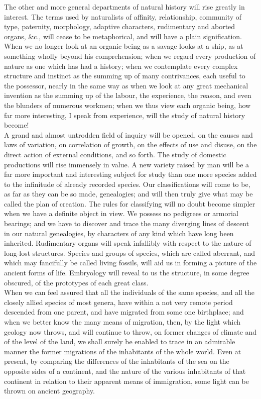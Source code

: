 \indent The other and more general departments of natural history will rise greatly in interest. The terms used by naturalists of affinity, relationship, community of type, paternity, morphology, adaptive characters, rudimentary and aborted organs, \&c., will cease to be metaphorical, and will have a plain signification. When we no longer look at an organic being as a savage looks at a ship, as at something wholly beyond his comprehension; when we regard every production of nature as one which has had a history; when we contemplate every complex structure and instinct as the summing up of many contrivances, each useful to the possessor, nearly in the same way as when we look at any great mechanical invention as the summing up of the labour, the experience, the reason, and even the blunders of numerous workmen; when we thus view each organic being, how far more interesting, I speak from experience, will the study of natural history become!~\\
\indent A grand and almost untrodden field of inquiry will be opened, on the causes and laws of variation, on correlation of growth, on the effects of use and disuse, on the direct action of external conditions, and so forth. The study of domestic productions will rise immensely in value. A new variety raised by man will be a far more important and interesting subject for study than one more species added to the infinitude of already recorded species. Our classifications will come to be, as far as they can be so made, genealogies; and will then truly give what may be called the plan of creation. The rules for classifying will no doubt become simpler when we have a definite object in view. We possess no pedigrees or armorial bearings; and we have to discover and trace the many diverging lines of descent in our natural genealogies, by characters of any kind which have long been inherited. Rudimentary organs will speak infallibly with respect to the nature of long-lost structures. Species and groups of species, which are called aberrant, and which may fancifully be called living fossils, will aid us in forming a picture of the ancient forms of life. Embryology will reveal to us the structure, in some degree obscured, of the prototypes of each great class.~\\
\indent When we can feel assured that all the individuals of the same species, and all the closely allied species of most genera, have within a not very remote period descended from one parent, and have migrated from some one birthplace; and when we better know the many means of migration, then, by the light which geology now throws, and will continue to throw, on former changes of climate and of the level of the land, we shall surely be enabled to trace in an admirable manner the former migrations of the inhabitants of the whole world.  Even at present, by comparing the differences of the inhabitants of the sea on the opposite sides of a continent, and the nature of the various inhabitants of that continent in relation to their apparent means of immigration, some light can be thrown on ancient geography.~\\
